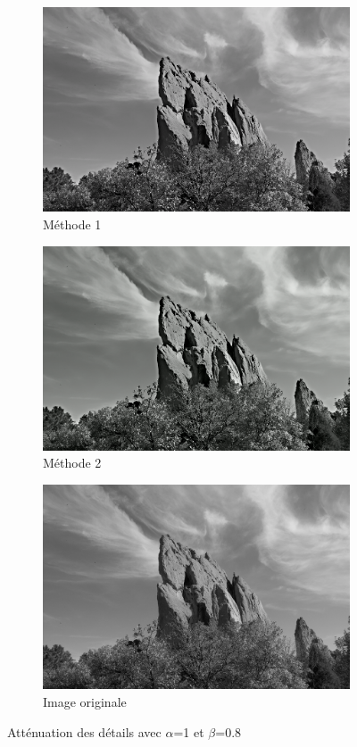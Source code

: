 \documentclass[twoside,UTF8]{EPURapport}
\begin{document}
\begin{figure}[H]
        \centering
        \begin{subfigure}[b]{0.3\textwidth}
                \includegraphics[scale=0.4]{images/rock_input1_1_08.png} 
                \caption{Méthode 1}
        \end{subfigure}
        \qquad \qquad
        \begin{subfigure}[b]{0.3\textwidth}
                \includegraphics[scale=0.4]{images/rock_input2_1_08.png}
                \caption{Méthode 2}
        \end{subfigure}
        
        \begin{subfigure}[b]{0.3\textwidth}
                \includegraphics[scale=0.4]{images/rock_input.png}
             	\caption{Image originale}
        \end{subfigure}
        \caption{Atténuation des détails avec $\alpha$=1 et $\beta$=0.8}
\end{figure}
\end{document}
